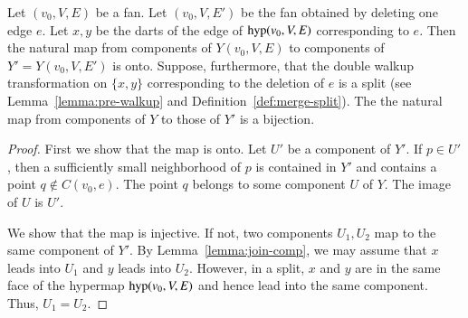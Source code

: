 \begin{lemma}
Let $(v_0,V,E)$ be a fan.  Let $(v_0,V,E')$
be the fan obtained by deleting one edge $e$.
Let $x,y$ be the darts of the edge of
${\operatorname{hyp}}(v_0,V,E)$ corresponding
to $e$.  Then
the natural map from components of $Y(v_0,V,E)$ to components
of $Y'=Y(v_0,V,E')$ is onto.
Suppose, furthermore, that the double walkup transformation
on $\{x,y\}$ corresponding to the deletion of $e$ is a split
(see Lemma~\ref{lemma:pre-walkup} 
and Definition~\ref{def:merge-split}).  
The the natural map from components of $Y$ to those of $Y'$ is a bijection.
\end{lemma}

\begin{proof}
First we show that the map is onto.  Let $U'$
be a component of $Y'$.  If $p\in U'$,
then a sufficiently small neighborhood of $p$ is contained
in $Y'$ and contains a point $q\not\in C(v_0,e)$.  The
point $q$ belongs to some component $U$ of $Y$.  The image
of $U$ is $U'$.

We show that the map is injective.  If not, two
components $U_1,U_2$ map to the same component of $Y'$.
By Lemma~\ref{lemma:join-comp}, we may assume
that $x$ leads into $U_1$ and
$y$ leads into $U_2$.
However, in a split, $x$ and $y$ are in the same face of
the hypermap ${\operatorname{hyp}}(v_0,V,E)$ and hence lead into the
same component.  Thus, $U_1=U_2$.
\end{proof}

%
%

